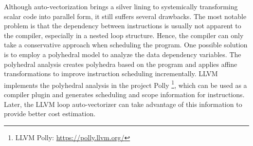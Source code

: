 Although auto-vectorization brings a silver lining to systemically transforming scalar code into parallel form, it still suffers several drawbacks. The most notable problem is that the dependency between instructions is usually not apparent to the compiler, especially in a nested loop structure. Hence, the compiler can only take a conservative approach when scheduling the program. One possible solution is to employ a polyhedral model \cite{polyhedral} to analyze the data dependency variables. The polyhedral analysis creates polyhedra based on the program and applies affine transformations to improve instruction scheduling incrementally. LLVM implements the polyhedral analysis in the project Polly \cite{polly} \footnote{LLVM Polly: \url{https://polly.llvm.org/}}, which can be used as a compiler plugin and generates scheduling and scope information for instructions. Later, the LLVM loop auto-vectorizer can take advantage of this information to provide better cost estimation.
